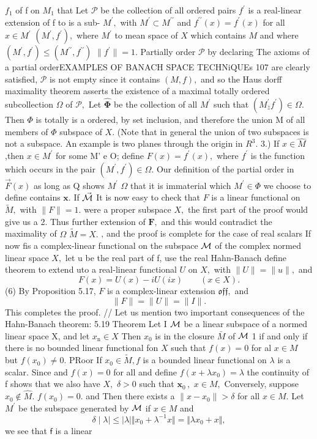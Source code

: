$f_{1}$ of f on $M_{1}$ that Let $\mathcal{P}$ be the collection of all ordered pairs $f^{\prime}$ is a real-linear extension of f to is a sub- $M^{\prime},$ with $M^{\prime}\subset M^{\prime\prime}$ and $f^{\prime\prime}(x)=f^{\prime}(x)$ for all $x\in M^{\prime}$ $(M^{\prime},f^{\prime}),$ where $M^{\prime}$ to mean space of $X$ which contains $\textstyle{M}$ and where $(M^{\prime},f^{\prime})\leq(M^{\prime\prime},f^{\prime\prime})$ $\|f^{\prime}\|=1.$ Partially order $\mathcal{P}$ by declaring The axioms of a partial orderEXAMPLES OF BANACH SPACE TECHNiQUEs 107 are clearly satisfied, ${\mathcal{P}}$ is not empty since it contains $(M,f),$ and so the Haus dorff maximality theorem asserts the existence of a maximal totally ordered subcollection $\Omega$ of ${\mathcal{P}},$ Let $\mathbf{\hat{\Phi}}$ be the collection of all $M^{\prime}$ such that $(M_{\bar{z}}^{\prime}f^{\prime})\in\Omega.$ Then $\Phi$ is totally is a ordered, by set inclusion, and therefore the union M of all members of $\Phi$ subspace of $X.$ (Note that in general the union of two subspaces is not a subspace. An example is two planes through the origin in $R^{3}.$ 3.) If $x\in{\hat{M}}$ ,then $x\in M^{\prime}$ for some M' e O; define $F(x)=f^{\prime}(x),$ where $f^{\prime}$ is the function which occurs in the pair $(M^{\prime},f^{\prime})\in\Omega.$ Our definition of the partial order in $\scriptstyle{\vec{F}}(x)$ as long as Q shows $M^{\prime}$ $\Omega$ that it is immaterial which $M^{\prime}\in\Phi$ we choose to define contains $\mathbf{x}.$ If $\vec{\cal M}$ It is now easy to check that ${\mathbf{}}F$ is a linear functional on ${\widetilde{M}},$ with $\|F\|=1.$ were a proper subspace $X,$ the first part of the proof would give us a 2. Thus further extension of ${\boldsymbol{F}},$ and this would contradict the maximality of $\Omega$ ${\tilde{M}}=X.$ , and the proof is complete for the case of real scalars If now fis a complex-linear functional on the subspace ${\cal{M}}$ of the complex normed linear space $X,$ let u be the real part of f, use the real Hahn-Banach define theorem to extend uto a real-linear functional $U$ on $X,$ with $\|U\|=\|u\|,$ and $$ F(x)=U(x)-i U(i x)\qquad(x\in X). $$ (6) By Proposition 5.17, ${\mathbf{}}F$ is a complex-linear extension ${\mathfrak{o f}}{\mathfrak{f}},$ and $$ \|F\|=\|U\|=\|I\|. $$ This completes the proof. // Let us mention two important consequences of the Hahn-Banach theorem: 5.19 Theorem Let I ${\cal{M}}$ be a linear subspace of a normed linear space X, and let $x_{\mathrm{n}}\in X$ Then $x_{0}$ is in the closure $\bar{M}$ of ${\cal{M}}$ 1 if and only if there is no bounded linear functional fon $X$ such that $f(x)=0$ for al $x\in M$ but $f(x_{0})\neq0.$ PRoor If $x_{0}\in{\tilde{M}},f$ is a bounded linear functional on $\lambda$ is a scalar. Since and $f(x)=0$ for all and define $f(x+\lambda x_{0})=\lambda$ the continuity of f shows that we also have $X,$ $\delta>0$ such that ${\boldsymbol{x}}_{0}\,,$ $x\in M,$ Conversely, suppose $x_{0}\notin{\hat{M}}.$ $f(x_{0})=0.$ and Then there exists a $\|x-x_{0}\|>\delta$ for all $x\in M.$ Let $M^{\prime}$ be the subspace generated by ${\cal M}$ if $x\in M$ and $$ \delta\mid\lambda\mid\leq\mid\lambda\mid\Vert x_{0}+\lambda^{-1}x\Vert=\Vert\lambda x_{0}+x\Vert, $$ we see that $\boldsymbol{\mathsf{f}}$ is a linear 